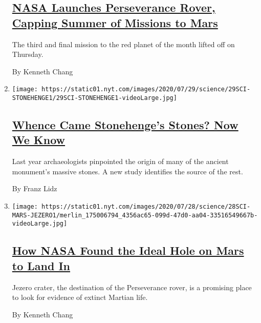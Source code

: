 \begin{enumerate}
{  \subsection{\texorpdfstring{\href{/2020/07/30/science/nasa-mars-launch.html}{NASA
  Launches Perseverance Rover, Capping Summer of Missions to
  Mars}}{NASA Launches Perseverance Rover, Capping Summer of Missions to Mars}}\label{nasa-launches-perseverance-rover-capping-summer-of-missions-to-mars}}

  The third and final mission to the red planet of the month lifted off
  on Thursday.

  By Kenneth Chang
\item
  \texttt{[image: https://static01.nyt.com/images/2020/07/29/science/29SCI-STONEHENGE1/29SCI-STONEHENGE1-videoLarge.jpg]}

  \hypertarget{whence-came-stonehenges-stones-now-we-know}{%
  \subsection{\texorpdfstring{\href{/2020/07/29/science/stonehenge-archaeology-sarsens.html}{Whence
  Came Stonehenge's Stones? Now We
  Know}}{Whence Came Stonehenge's Stones? Now We Know}}\label{whence-came-stonehenges-stones-now-we-know}}

  Last year archaeologists pinpointed the origin of many of the ancient
  monument's massive stones. A new study identifies the source of the
  rest.

  By Franz Lidz
\item
  \texttt{[image: https://static01.nyt.com/images/2020/07/28/science/28SCI-MARS-JEZERO1/merlin\_175006794\_4356ac65-099d-47d0-aa04-33516549667b-videoLarge.jpg]}

  \hypertarget{how-nasa-found-the-ideal-hole-on-mars-to-land-in}{%
  \subsection{\texorpdfstring{\href{/2020/07/28/science/nasa-jezero-perseverance.html}{How
  NASA Found the Ideal Hole on Mars to Land
  In}}{How NASA Found the Ideal Hole on Mars to Land In}}\label{how-nasa-found-the-ideal-hole-on-mars-to-land-in}}

  Jezero crater, the destination of the Perseverance rover, is a
  promising place to look for evidence of extinct Martian life.

  By Kenneth Chang
\end{enumerate}

